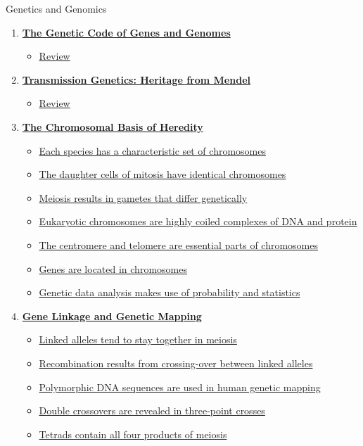 \documentclass[12pt,letterpaper]{article}
\begin{document}
\begin{contbox}{Genetics and Genomics}{ 
\begin{enumerate}[font=\bfseries, wide]
\item \hyperlink{1}{\textbf{The Genetic Code of Genes and Genomes}}
    \begin{itemize}
        \item \hyperlink{1.r}{Review}
    \end{itemize}
    \item \hyperlink{2}{\textbf{Transmission Genetics: Heritage from Mendel}}
    \begin{itemize}
        \item \hyperlink{2.r}{Review}
    \end{itemize}
    \item \hyperlink{3}{\textbf{The Chromosomal Basis of Heredity}}
    \begin{itemize}
        \item \hyperlink{3.1}{Each species has a characteristic set of chromosomes}
        \item \hyperlink{3.2}{The daughter cells of mitosis have identical chromosomes}
        \item \hyperlink{3.3}{Meiosis results in gametes that differ genetically}
        \item \hyperlink{3.4}{Eukaryotic chromosomes are highly coiled complexes of DNA and protein}
        \item \hyperlink{3.5}{The centromere and telomere are essential parts of chromosomes}
        \item \hyperlink{3.6}{Genes are located in chromosomes}
        \item \hyperlink{3.7}{Genetic data analysis makes use of probability and statistics}
    \end{itemize}
    \item \hyperlink{4}{\textbf{Gene Linkage and Genetic Mapping}}
    \begin{itemize}
        \item \hyperlink{4.1}{Linked alleles tend to stay together in meiosis}
        \item \hyperlink{4.2}{Recombination results from crossing-over between linked alleles}
        \item \hyperlink{4.3}{Polymorphic DNA sequences are used in human genetic mapping}
        \item \hyperlink{4.4}{Double crossovers are revealed in three-point crosses}
        \item \hyperlink{4.5}{Tetrads contain all four products of meiosis}

\end{itemize}
\end{enumerate}}
\end{contbox}
\end{document}
